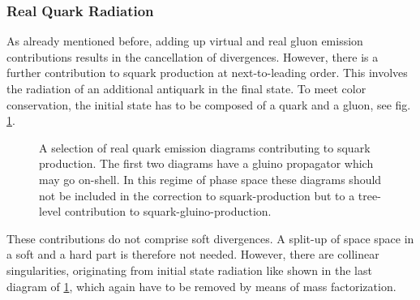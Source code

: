 \subsubsection{Real Quark Radiation}
As already mentioned before, adding up virtual and real gluon emission contributions results in the cancellation of divergences. However, there is a further contribution to squark production at next-to-leading order. This involves the radiation of an additional antiquark in the final state. To meet color conservation, the initial state has to be composed of a quark and a gluon, see fig. \ref{fig:quarkradiation}.
\begin{figure}[!htbp]
\begin{center}
\caption{A selection of real quark emission diagrams contributing to squark production. The first two diagrams have a gluino propagator which may go on-shell. In this regime of phase space these diagrams should not be included in the correction to squark-production but to a tree-level contribution to squark-gluino-production.}\label{fig:quarkradiation}
\end{center}
\end{figure}
These contributions do not comprise soft divergences. A split-up of space space in a soft and a hard part is therefore not needed. However, there are collinear singularities, originating from initial state radiation like shown in the last diagram of \ref{fig:quarkradiation}, which again have to be removed by means of mass factorization.\\
